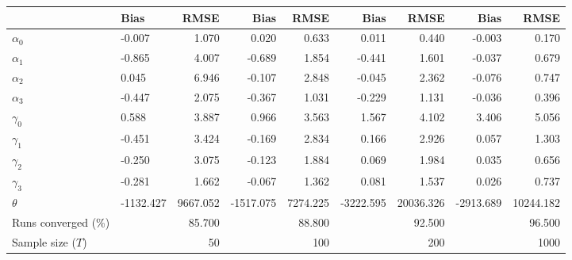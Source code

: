 
\begin{tabular}[t]{llrrrrrrr}
\toprule
  & Bias & RMSE & Bias & RMSE & Bias & RMSE & Bias & RMSE\\
\midrule
$\alpha_{0}$ & -0.007 & 1.070 & 0.020 & 0.633 & 0.011 & 0.440 & -0.003 & 0.170\\
$\alpha_{1}$ & -0.865 & 4.007 & -0.689 & 1.854 & -0.441 & 1.601 & -0.037 & 0.679\\
$\alpha_{2}$ & 0.045 & 6.946 & -0.107 & 2.848 & -0.045 & 2.362 & -0.076 & 0.747\\
$\alpha_{3}$ & -0.447 & 2.075 & -0.367 & 1.031 & -0.229 & 1.131 & -0.036 & 0.396\\
$\gamma_{0}$ & 0.588 & 3.887 & 0.966 & 3.563 & 1.567 & 4.102 & 3.406 & 5.056\\
$\gamma_{1}$ & -0.451 & 3.424 & -0.169 & 2.834 & 0.166 & 2.926 & 0.057 & 1.303\\
$\gamma_{2}$ & -0.250 & 3.075 & -0.123 & 1.884 & 0.069 & 1.984 & 0.035 & 0.656\\
$\gamma_{3}$ & -0.281 & 1.662 & -0.067 & 1.362 & 0.081 & 1.537 & 0.026 & 0.737\\
$\theta$ & -1132.427 & 9667.052 & -1517.075 & 7274.225 & -3222.595 & 20036.326 & -2913.689 & 10244.182\\
Runs converged (\%) &  & 85.700 &  & 88.800 &  & 92.500 &  & 96.500\\
Sample size ($T$) &  & 50 &  & 100 &  & 200 &  & 1000\\
\bottomrule
\end{tabular}
